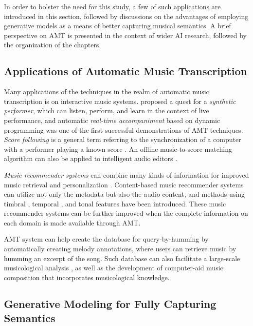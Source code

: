 In order to bolster the need for this study, a few of such applications are introduced in this section, followed by discussions on the advantages of employing generative models as a means of better capturing musical semantics.
A brief perspective on AMT is presented in the context of wider AI research, followed by the organization of the chapters.


\subsection{Applications of Automatic Music Transcription}\label{sec:applications}

Many applications of the techniques in the realm of automatic music transcription is on interactive music systems.
 proposed a quest for a \emph{synthetic performer}, which can listen, perform, and learn in the context of live performance, and automatic \emph{real-time accompaniment} \cite{dannenberg1985accompaniment} based on dynamic programming was one of the first successful demonstrations of AMT techniques.
\emph{Score following} is a general term referring to the synchronization of a computer with a performer playing a known score \cite{orio2003following}.
An offline music-to-score matching algorithm can also be applied to intelligent audio editors \cite{dannenberg2003following}.

\emph{Music recommender systems} can combine many kinds of information for improved music retrieval and personalization \cite{celma2010music}.
Content-based music recommender systems can utilize not only the metadata but also the audio content, and methods using timbral \cite{magno2008recommendation}, temporal \cite{li2007recommender}, and tonal features \cite{lu2009recommendation} have been introduced.
These music recommender systems can be further improved when the complete information on each domain is made available through AMT.

AMT system can help create the database for query-by-humming \cite{ghias1995humming} by automatically creating melody annotations, where users can retrieve music by humming an excerpt of the song.
Such database can also facilitate a large-scale musicological analysis \cite{abdallah2015british}, as well as the development of computer-aid music composition \cite{agostini2013aid} that incorporates musicological knowledge.


\subsection{Generative Modeling for Fully Capturing Semantics}


